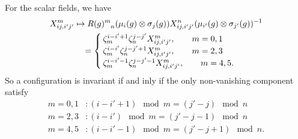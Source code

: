         For the scalar fields, we have
        \begin{align}
            X^m_{ij,i'j'}&\mapsto R(g)\indices{^m_n}(\mu_i(g)\otimes\sigma_j(g))X^n_{ij,i'j'}(\mu_{i'}(g)\otimes\sigma_{j'}(g))^{-1}\\
            &\quad =
            \begin{cases}
                \zeta^{i-i'+1}_m\zeta^{j-j'}_n X^m_{ij,i'j'},\qquad m=0,1\\
                \zeta^{i-i'}_m\zeta^{j-j'+1}_n X^m_{ij,i'j'},\qquad m=2,3\\
                \zeta^{i-i'-1}_m\zeta^{j-j'-1}_n X^m_{ij,i'j'},\qquad m=4,5.
            \end{cases}
        \end{align}
        So a configuration is invariant if and inly if the only non-vanishing component satisfy
        \begin{align}
            m=0,1 &: (i-i'+1)\mod m = (j'-j)\mod n\\
            m=2,3 &: (i-i')\mod m = (j'-j-1)\mod n\\
            m=4,5 &: (i-i'-1)\mod m = (j'-j+1)\mod n.
        \end{align}

        


